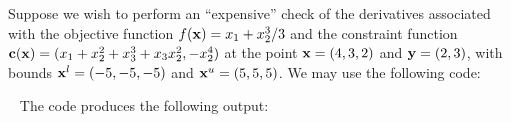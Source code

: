 \documentclass{galahad}
\begin{document}





\galexamples
Suppose we wish to perform an ``expensive'' check of the derivatives associated with the objective function
$f({\mathbf{x}}) = x_1 + x_2^3/3$ and the constraint function
${\mathbf{c}}({\mathbf{x}}) = (x_1 + x_2^2 + x_3^3 + x_3x_2^2, -x_2^4)$ at the point
${\mathbf{x}} = (4,3,2)$ and ${\mathbf{y}} = (2,3)$, with bounds ${\mathbf{x}}^l = (-5,-5,-5)$ and
${\mathbf{x}}^u = (5,5,5)$.
We may use the following code:

{\tt \small
\VerbatimInput{\packageexample}
}
\noindent
The code produces the following output:
{\tt \small
\VerbatimInput{\packageresults}
}

\noindent
\end{document}
